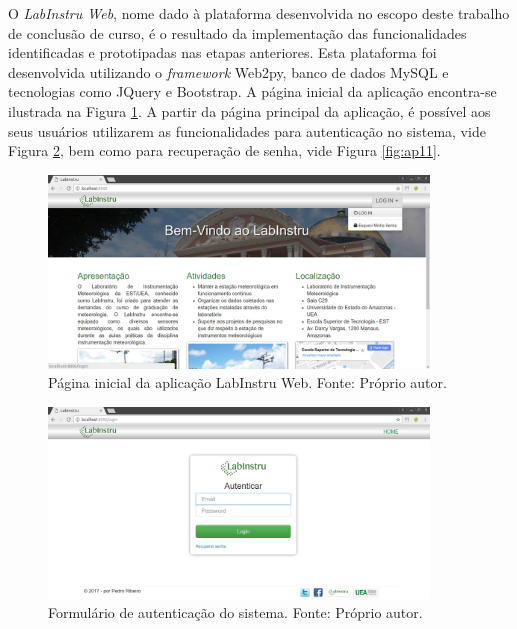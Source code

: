 O \emph{LabInstru Web}, nome dado à plataforma desenvolvida no escopo deste trabalho de conclusão de curso, é o resultado da implementação das funcionalidades identificadas e prototipadas nas etapas anteriores. Esta plataforma foi desenvolvida utilizando o \emph{framework} Web2py, banco de dados MySQL e tecnologias como JQuery e Bootstrap. A página inicial da aplicação encontra-se ilustrada na Figura \ref{fig:ap1}. A partir da página principal da aplicação, é possível aos seus usuários utilizarem as funcionalidades para autenticação no sistema, vide Figura \ref{fig:ap10}, bem como para recuperação de senha, vide Figura  \ref{fig:ap11}.



\begin{figure}[h!]
	\centering
	\includegraphics[width=0.9\textwidth]{./img/ap1.png}
	\caption{Página inicial da aplicação LabInstru Web. Fonte: Próprio autor.} \label{fig:ap1}
\end{figure}

\begin{figure}[h!]
	\centering
	\includegraphics[width=0.9\textwidth]{./img/ap10.png}
	\caption{Formulário de autenticação do sistema. Fonte: Próprio autor.} \label{fig:ap10}
\end{figure}



